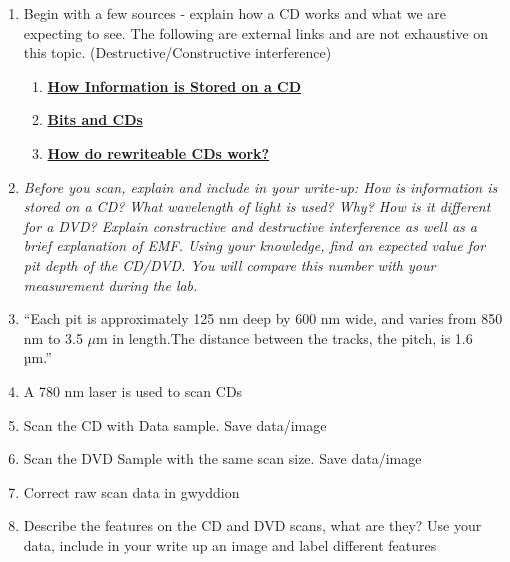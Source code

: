 \documentclass{../lab}
\begin{document}
\begin{enumerate}
    \item Begin with a few sources - explain how a CD works and what we are expecting to see. The following are external links and are not exhaustive on this topic. (Destructive/Constructive interference)

    \begin{enumerate}

        \item \href{http://experimentationlab.berkeley.edu/sites/default/files/How\%20Information\%20is\%20Stored\%20on\%20a\%20CD.mp4}{\textbf{How Information is Stored on a CD}}

        \item \href{http://experimentationlab.berkeley.edu/sites/default/files/Bits_and_CDs.pdf}{\textbf{Bits and CDs}}

        \item \href{http://experimentationlab.berkeley.edu/sites/default/files/How_do_Rewriteable_CDs_work.pdf}{\textbf{How do rewriteable CDs work?}}

    \end{enumerate}

    \item \emph{Before you scan, explain and include in your write-up: How is information is stored on a CD? What wavelength of light is used? Why? How is it different for a DVD? Explain constructive and destructive interference as well as a brief explanation of EMF. Using your knowledge, find an expected value for pit depth of the CD/DVD. You will compare this number with your measurement during the lab. }

    \item ``Each pit is approximately 125 nm deep by 600 nm wide, and varies from 850 nm to 3.5 $\mu$m in length.The distance between the tracks, the pitch, is 1.6 µm.''

    \item A 780 nm laser is used to scan CDs

    \item Scan the CD with Data sample. Save data/image

    \item Scan the DVD Sample with the same scan size.  Save data/image

    \item Correct raw scan data in gwyddion

    \item Describe the features on the CD and DVD scans, what are they? Use your data, include in your write up an image and label different features


\end{enumerate}
\end{document}
